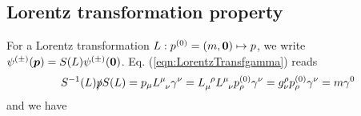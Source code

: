 \bigskip

\bigskip
\noindent
\subsection{Lorentz transformation property}
\label{sec:AppDirac_LorentzTransf}

For a Lorentz transformation $L: p^{(0)} = (m, \mbox{\boldmath $0$}) \mapsto p$, we write
$\psi^{(\pm)}(\mbox{\boldmath $p$}) = S(L) \psi^{(\pm)}(\mbox{\boldmath $0$})$.
Eq. (\ref{eqn:LorentzTransfgamma}) reads
\begin{eqnarray*}
S^{-1}(L) \slashed{p} S(L)
=
p_\mu L^\mu_{\;\;\nu} \gamma^\nu
=
L_\mu^{\;\;\rho} L^\mu_{\;\;\nu} p^{(0)}_\rho \gamma^\nu
=
g^\rho_\nu p^{(0)}_\rho \gamma^\nu
=
m \gamma^0
\end{eqnarray*}
and we have

\bigskip

